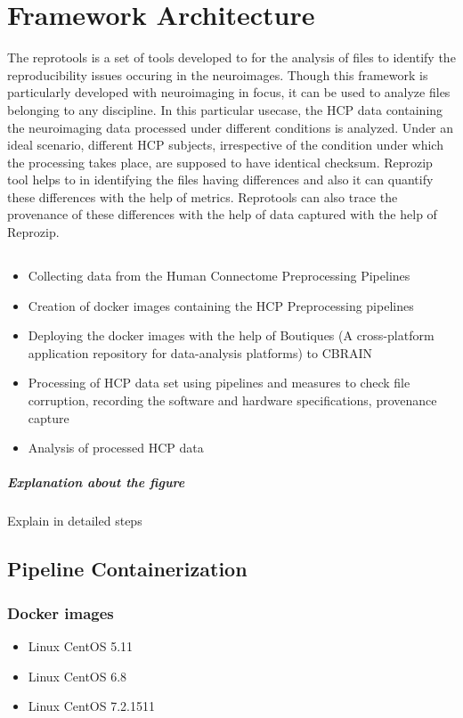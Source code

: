 \chapter{Framework Architecture}
The reprotools  is a set of tools developed to for the analysis of files to identify the reproducibility issues occuring in the neuroimages. Though this framework is particularly developed with neuroimaging in focus, it can be used to analyze files belonging to any discipline. In this particular usecase, the HCP data containing the neuroimaging data processed under different conditions is analyzed. Under an ideal scenario, different HCP subjects, irrespective of the condition under which the processing takes place, are supposed to have identical checksum. Reprozip tool helps to in identifying the files having differences and also it can quantify these differences with the help of metrics. Reprotools can also trace the provenance of these differences with the help of data captured with the help of Reprozip.
\section{}
\begin{itemize}
  \item Collecting data from the Human Connectome Preprocessing Pipelines \cite{DBHumanConnectome}
  \item Creation of docker images containing the HCP Preprocessing pipelines
  \item Deploying the docker images with the help of Boutiques (A cross-platform application repository for data-analysis platforms) to CBRAIN
  \item Processing of HCP data set using pipelines and measures to check file corruption, recording the software and hardware specifications, provenance capture
  \item Analysis of processed HCP data
\end{itemize} 
 
\paragraph{Explanation about the figure}
Explain in detailed steps

\section{Pipeline Containerization}
\subsection{Docker images}
\begin{itemize}
  \item Linux CentOS 5.11
  \item Linux CentOS 6.8 
  \item Linux CentOS 7.2.1511
\end{itemize}


